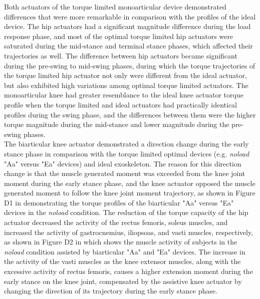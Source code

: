\documentclass[10pt,letterpaper]{article}
\begin{document}
Both actuators of the torque limited monoarticular device demonstrated differences that were more remarkable in comparison with the profiles of the ideal device. The hip actuators had a significant magnitude difference during the load response phase, and most of the optimal torque limited hip actuators were saturated during the mid-stance and terminal stance phases, which affected their trajectories as well. The difference between hip actuators became significant during the pre-swing to mid-swing phases, during which the torque trajectories of the torque limited hip actuator not only were different from the ideal actuator, but also exhibited high variations among optimal torque limited actuators. The monoarticular knee had greater resemblance to the ideal knee actuator torque profile when the torque limited and ideal actuators had practically identical profiles during the swing phase, and the differences between them were the higher torque magnitude during the mid-stance and lower magnitude during the pre-swing phases.\\
The biarticular knee actuator demonstrated a direction change during the early stance phase in comparison with the torque limited optimal devices (e.g. {\it noload} "Aa" versus "Ea" devices) and ideal exoskeleton. The reason for this direction change is that the muscle generated moment was exceeded from the knee joint moment during the early stance phase, and the knee actuator opposed the muscle generated moment to follow the knee joint moment trajectory, as shown in Figure D1 in  demonstrating the torque profiles of the biarticular "Aa" versus "Ea" devices in the {\it noload} condition. The reduction of the torque capacity of the hip actuator decreased the activity of the rectus femoris, soleus muscles, and increased the activity of gastrocnemius, iliopsoas, and vasti muscles, respectively, as shown in Figure D2 in  which shows the muscle activity of subjects in the {\it noload} condition assisted by biarticular "Aa" and "Ea" devices. The increase in the activity of the vasti muscles as the knee extensor muscles, along with the excessive activity of rectus femoris, causes a higher extension moment during the early stance on the knee joint, compensated by the assistive knee actuator by changing the direction of its trajectory during the early stance phase.\\
\end{document}
